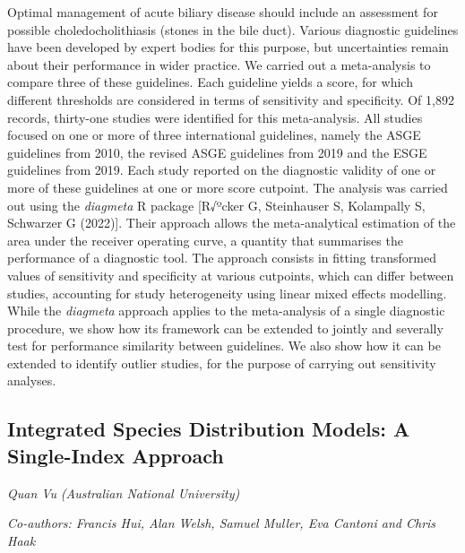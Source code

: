 \documentclass[
]{scrreprt}
\begin{document}
Optimal management of acute biliary disease should include an assessment
for possible choledocholithiasis (stones in the bile duct). Various
diagnostic guidelines have been developed by expert bodies for this
purpose, but uncertainties remain about their performance in wider
practice. We carried out a meta-analysis to compare three of these
guidelines. Each guideline yields a score, for which different
thresholds are considered in terms of sensitivity and specificity. Of
1,892 records, thirty-one studies were identified for this
meta-analysis. All studies focused on one or more of three international
guidelines, namely the ASGE guidelines from 2010, the revised ASGE
guidelines from 2019 and the ESGE guidelines from 2019. Each study
reported on the diagnostic validity of one or more of these guidelines
at one or more score cutpoint. The analysis was carried out using the
\emph{diagmeta} R package {[}R√ºcker G, Steinhauser S, Kolampally S,
Schwarzer G (2022){]}. Their approach allows the meta-analytical
estimation of the area under the receiver operating curve, a quantity
that summarises the performance of a diagnostic tool. The approach
consists in fitting transformed values of sensitivity and specificity at
various cutpoints, which can differ between studies, accounting for
study heterogeneity using linear mixed effects modelling. While the
\emph{diagmeta} approach applies to the meta-analysis of a single
diagnostic procedure, we show how its framework can be extended to
jointly and severally test for performance similarity between
guidelines. We also show how it can be extended to identify outlier
studies, for the purpose of carrying out sensitivity analyses.

\subsection{Integrated Species Distribution Models: A Single-Index
Approach}\label{integrated-species-distribution-models-a-single-index-approach}

\emph{Quan Vu} \emph{(Australian National University)}

\emph{Co-authors: Francis Hui, Alan Welsh, Samuel Muller, Eva Cantoni
and Chris Haak}

\setlength{\parskip}{0.5em}
\end{document}

